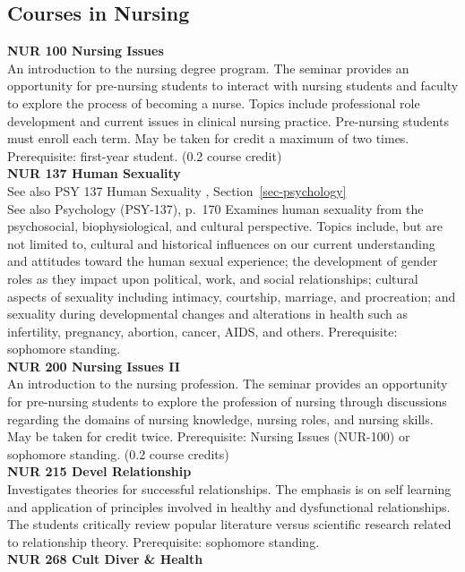 \documentclass[
  letterpaper,
]{scrbook}
\begin{document}
\subsection{Courses in Nursing}\label{courses-in-nursing}

\textbf{NUR 100 Nursing Issues}\\
An introduction to the nursing degree program. The seminar provides an
opportunity for pre-nursing students to interact with nursing students
and faculty to explore the process of becoming a nurse. Topics include
professional role development and current issues in clinical nursing
practice. Pre-nursing students must enroll each term. May be taken for
credit a maximum of two times. Prerequisite: first-year student. (0.2
course credit)\\
\textbf{NUR 137 Human Sexuality}\\
See also PSY 137 Human Sexuality , Section~\ref{sec-psychology}\\
See also Psychology (PSY-137), p.~170 Examines human sexuality from the
psychosocial, biophysiological, and cultural perspective. Topics
include, but are not limited to, cultural and historical influences on
our current understanding and attitudes toward the human sexual
experience; the development of gender roles as they impact upon
political, work, and social relationships; cultural aspects of sexuality
including intimacy, courtship, marriage, and procreation; and sexuality
during developmental changes and alterations in health such as
infertility, pregnancy, abortion, cancer, AIDS, and others.
Prerequisite: sophomore standing.\\
\textbf{NUR 200 Nursing Issues II}\\
An introduction to the nursing profession. The seminar provides an
opportunity for pre-nursing students to explore the profession of
nursing through discussions regarding the domains of nursing knowledge,
nursing roles, and nursing skills. May be taken for credit twice.
Prerequisite: Nursing Issues (NUR-100) or sophomore standing. (0.2
course credits)\\
\textbf{NUR 215 Devel Relationship}\\
Investigates theories for successful relationships. The emphasis is on
self learning and application of principles involved in healthy and
dysfunctional relationships. The students critically review popular
literature versus scientific research related to relationship theory.
Prerequisite: sophomore standing.\\
\textbf{NUR 268 Cult Diver \& Health}\\
\end{document}
